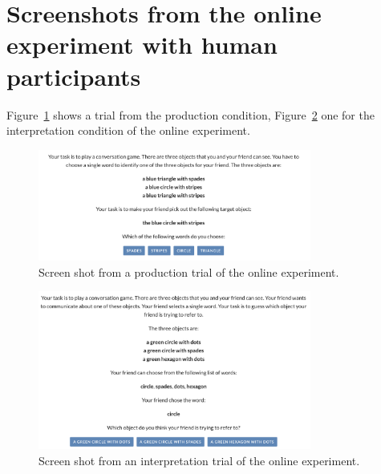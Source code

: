 \documentclass[fleqn]{article}
\begin{document}
\printbibliography[heading=bibintoc]

\newpage
\appendix



\section{Screenshots from the online experiment with human participants}
\label{sec:scre-from-online}

Figure~\ref{fig:refgame-screenshot-production} shows a trial from the production condition, Figure~\ref{fig:refgame-screenshot-interpretation} one for the interpretation condition of the online experiment.

\begin{figure}[H]
  \centering
  \includegraphics[width = 0.8\textwidth]{00-pics/refgame-production.png}

  \caption{Screen shot from a production trial of the online experiment.}
  \label{fig:refgame-screenshot-production}
\end{figure}

\begin{figure}[H]
  \centering
  \includegraphics[width = 0.8\textwidth]{00-pics/refgame-interpretation.png}

  \caption{Screen shot from an interpretation trial of the online experiment.}
  \label{fig:refgame-screenshot-interpretation}
\end{figure}
\end{document}
